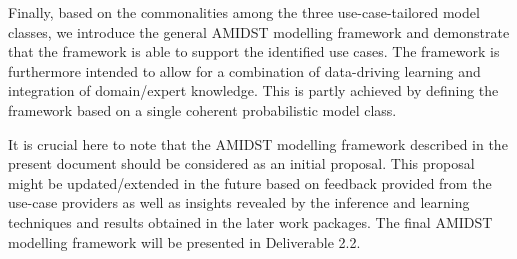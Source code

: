 
Finally, based on the commonalities among the three use-case-tailored model classes, we introduce the general AMIDST
modelling framework and demonstrate that the framework is able to support the identified use cases. The framework is
furthermore intended to allow for a combination of data-driving learning and integration of domain/expert knowledge. This
is partly achieved by defining the framework based on a single coherent probabilistic model class.




It is crucial here to note that the AMIDST modelling framework described in the present document should be considered as an initial proposal. This
proposal might be updated/extended in the future based on feedback provided from the use-case providers as well as insights
revealed by the inference and learning techniques and results obtained in the later work packages. The final AMIDST
modelling framework will be presented in Deliverable 2.2. 


